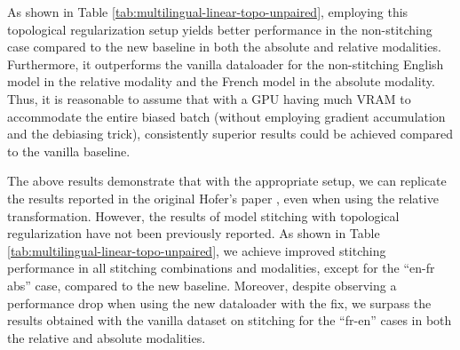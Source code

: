\documentclass[../main.tex]{subfiles}
\begin{document}
As shown in Table \ref{tab:multilingual-linear-topo-unpaired}, employing this topological regularization setup yields better performance in the non-stitching case compared to the new baseline in both the absolute and relative modalities. Furthermore, it outperforms the vanilla dataloader for the non-stitching English model in the relative modality and the French model in the absolute modality. Thus, it is reasonable to assume that with a GPU having much VRAM to accommodate the entire biased batch (without employing gradient accumulation and the debiasing trick), consistently superior results could be achieved compared to the vanilla baseline.\\

\begin{table}[ht!]
\centering
{}
\caption{Topological regularization (over two random seeds)}
\label{tab:multilingual-linear-topo-unpaired}
\end{table}

The above results demonstrate that with the appropriate setup, we can replicate the results reported in the original Hofer's paper \cite{hofer_densified_2021}, even when using the relative transformation. However, the results of model stitching with topological regularization have not been previously reported. As shown in Table \ref{tab:multilingual-linear-topo-unpaired}, we achieve improved stitching performance in all stitching combinations and modalities, except for the ``en-fr abs'' case, compared to the new baseline. Moreover, despite observing a performance drop when using the new dataloader with the fix, we surpass the results obtained with the vanilla dataset on stitching for the ``fr-en'' cases in both the relative and absolute modalities.
\end{document}
